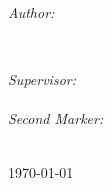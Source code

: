 \begin{titlepage}
    \begin{minipage}{0.4\textwidth}
    \begin{flushleft} \large
    \emph{Author:}\\
    \reportauthor %
    \end{flushleft}
    \end{minipage}
    ~
    \begin{minipage}{0.4\textwidth}
    \begin{flushright} \large
    \emph{Supervisor:} \\
    \supervisor \\ %
    \vspace{1em}
    \emph{Second Marker:} \\
    \secondMarker %
    \end{flushright}
    \end{minipage}\\[4cm]
    
    
    
    
    
    
    
    {\large \today} %
    
    
    \vfill %
    
    \end{titlepage}
    